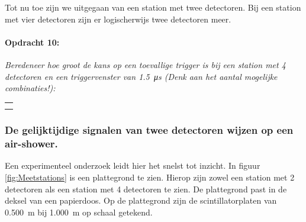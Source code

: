 \bigskip{}


Tot nu toe zijn we uitgegaan van een station met twee detectoren.
Bij een station met vier detectoren zijn er logischerwijs twee detectoren
meer.

\begin{minipage}[t]{1\columnwidth}%

\paragraph{Opdracht 10:}

\textit{Beredeneer hoe groot de kans op een toevallige trigger is
bij een station met 4 detectoren en een triggervenster van \SI{1.5}{\micro\second}
(Denk aan het aantal mogelijke combinaties!):}

\begin{tabular}{>{\raggedright}p{16.6cm}}
\tabularnewline
\hline 
\tabularnewline
\hline 
\tabularnewline
\hline 
\tabularnewline
\hline 
\end{tabular}%
\end{minipage}

\bigskip{}



\subsubsection{De gelijktijdige signalen van twee detectoren wijzen op een air-shower.}

Een experimenteel onderzoek leidt hier het snelst tot inzicht. In
figuur \ref{fig:Meetstations} is een plattegrond te zien. Hierop
zijn zowel een station met 2 detectoren als een station met 4 detectoren
te zien. De plattegrond past in de deksel van een papierdoos. Op de
plattegrond zijn de scintillatorplaten van \SI{0.500}{\meter} bij
\SI{1.000}{\meter} op schaal getekend. 

